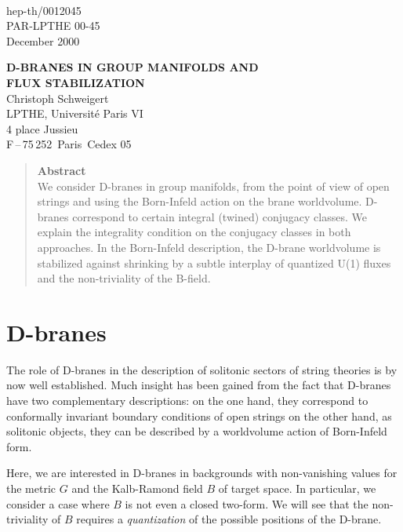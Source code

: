 \documentclass[a4paper,12pt]{article} \usepackage{amssymb,amsfonts,latexsym}
\begin{document}
\begin{flushright}  {~} \\[-1cm]
{\sf hep-th/0012045}\\{\sf PAR-LPTHE 00-45}\\[1mm]
{\sf December 2000} \end{flushright}

\begin{center} \vskip 14mm
{\Large\bf D-BRANES IN GROUP MANIFOLDS AND} \\[4mm]
{\Large\bf FLUX STABILIZATION}\\[20mm]
{\large Christoph Schweigert}
\\[8mm]
LPTHE, Universit\'e Paris VI~~~{}\\
4 place Jussieu\\ F\,--\,75\,252\, Paris\, Cedex 05
\end{center}
\vskip 18mm
\begin{quote}{\bf Abstract}\\[1mm]
We consider D-branes in group manifolds, from the point of view
of open strings and using the Born-Infeld action on the brane
worldvolume. D-branes correspond to certain integral (twined) conjugacy 
classes. We explain the integrality condition on the conjugacy classes
in both approaches. In the Born-Infeld description, the D-brane worldvolume
is stabilized against shrinking by a subtle interplay of quantized U(1) fluxes
and the non-triviality of the B-field.
\end{quote}

\bigskip


\section{D-branes}

The role of D-branes in the description of solitonic sectors of string
theories is by now well established. Much insight has been gained from
the fact that D-branes have two complementary descriptions:
\nxt on the one hand, they correspond to conformally invariant
     boundary conditions of open strings
\nxt on the other hand, as solitonic objects, they can be described
     by a worldvolume action of Born-Infeld form.

Here, we are interested in D-branes in backgrounds with non-vanishing
values for the metric $G$ and the Kalb-Ramond field $B$ of
target space. In particular, we consider a case where $B$ is not
even a closed two-form. We will see that the non-triviality of $B$ 
requires a {\em quantization} of the possible positions of the D-brane.
\end{document}
